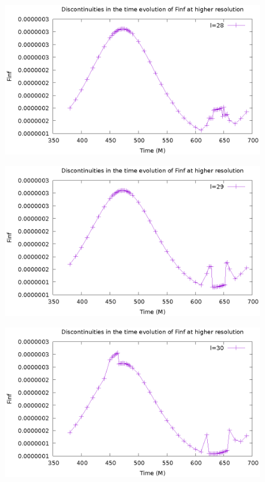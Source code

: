 \documentclass{article}
\begin{document}
\begin{figure}
  \includegraphics{FinfTimel28}
\end{figure}
\begin{figure}
  \includegraphics{FinfTimel29}
\end{figure}
\begin{figure}
  \includegraphics{FinfTimel30}
\end{figure}
\end{document}
